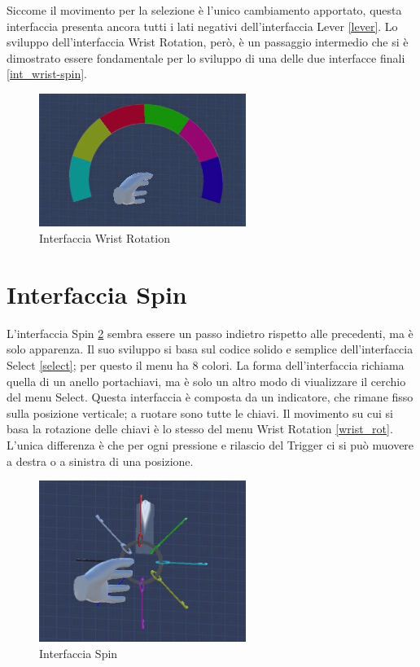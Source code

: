 \documentclass[target=bach,aauheader=]{thud}
\begin{document}
Siccome il movimento per la selezione è l'unico cambiamento apportato, questa interfaccia presenta ancora tutti i lati negativi dell'interfaccia Lever \ref{lever}.
Lo sviluppo dell'interfaccia Wrist Rotation, però, è un passaggio intermedio che si è dimostrato essere fondamentale per lo sviluppo di una delle due interfacce finali \ref{int_wrist-spin}.

\begin{figure}[h]
    \centering
    \includegraphics[width=0.60\textwidth]{wrist_rot}
    \caption{Interfaccia Wrist Rotation}
    \label{fig:wrist_rot}
\end{figure}

\section{Interfaccia Spin} %
\label{spin}
L'interfaccia Spin \ref{fig:spin} sembra essere un passo indietro rispetto alle precedenti, ma è solo apparenza.
Il suo sviluppo si basa sul codice solido e semplice dell'interfaccia Select \ref{select}; per questo il menu ha 8 colori.
La forma dell'interfaccia richiama quella di un anello portachiavi, ma è solo un altro modo di viualizzare il cerchio del menu Select.
Questa interfaccia è composta da un indicatore, che rimane fisso sulla posizione verticale; a ruotare sono tutte le chiavi.
Il movimento su cui si basa la rotazione delle chiavi è lo stesso del menu Wrist Rotation \ref{wrist_rot}.
L'unica differenza è che per ogni pressione e rilascio del Trigger ci si può muovere a destra o a sinistra di una posizione. \\

\begin{figure}[h]
    \centering
    \includegraphics[width=0.60\textwidth]{spin}
    \caption{Interfaccia Spin}
    \label{fig:spin}
\end{figure}
\end{document}
